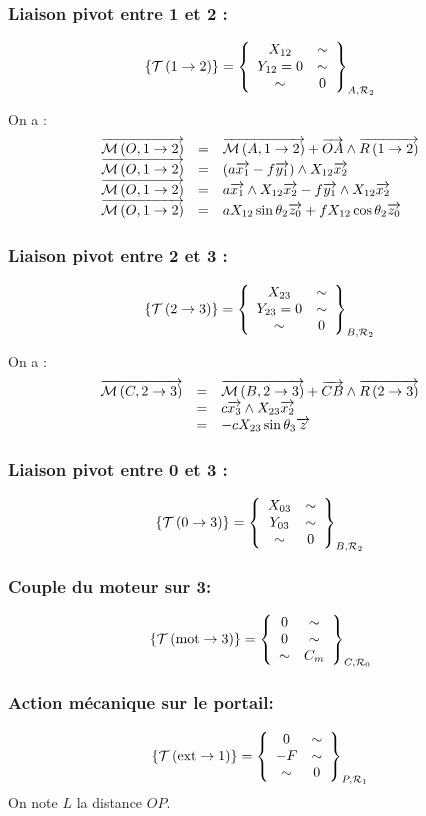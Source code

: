 \documentclass[10pt,fleqn]{article} %
\begin{document}
\subsubsection*{Liaison pivot entre 1 et 2 :}
$$
\torseurstat{T}{1}{2}
=\torseurcol{X_{12}}{Y_{12}=0}{\sim}{\sim}{\sim}{0}{A,\mathcal{R}_2}
$$

On a :
$$
\begin{array}{lcl}
\vectm{O}{1}{2} &=& \vectm{A}{1}{2} + \vect{OA} \wedge \vectf{1}{2} \\
\vectm{O}{1}{2} &=& \left( a \vx{1}-f \vy{1} \right) \wedge X_{12} \vx{2} \\
\vectm{O}{1}{2} &=&  a \vx{1}\wedge X_{12} \vx{2}-f \vy{1} \wedge X_{12} \vx{2}  \\
\vectm{O}{1}{2} &=&  a  X_{12} \sin\theta_2 \vz{0} +f   X_{12} \cos \theta_2 \vz{0} \\
\end{array}
$$


\subsubsection*{Liaison pivot entre 2 et 3 :}
$$
\torseurstat{T}{2}{3}
=\torseurcol{X_{23}}{Y_{23}=0}{\sim}{\sim}{\sim}{0}{B,\mathcal{R}_2}
$$


On a :
$$
\begin{array}{lcl}
\vectm{C}{2}{3} &=& \vectm{B}{2}{3} + \vect{CB} \wedge \vectf{2}{3} \\
&=& c\vect{x_3} \wedge X_{23} \vect{x_2} \\
&=& - c X_{23} \sin \theta_3\vect{z} \\
\end{array}
$$

\subsubsection*{Liaison pivot entre 0 et 3 :}
$$
\torseurstat{T}{0}{3}
=\torseurcol{X_{03}}{Y_{03}}{\sim}{\sim}{\sim}{0}{B,\mathcal{R}_2}
$$




\subsubsection*{Couple du moteur sur 3:}
$$
\torseurstat{T}{\text{mot}}{3}
=\torseurcol{0}{0}{\sim}{\sim}{\sim}{C_m}{C,\mathcal{R}_0}
$$


\subsubsection*{Action mécanique sur le portail:}
$$
\torseurstat{T}{\text{ext}}{1}
=\torseurcol{0}{-F}{\sim}{\sim}{\sim}{0}{P,\mathcal{R}_1}
$$
On note $L$ la distance $OP$.
\end{document}
